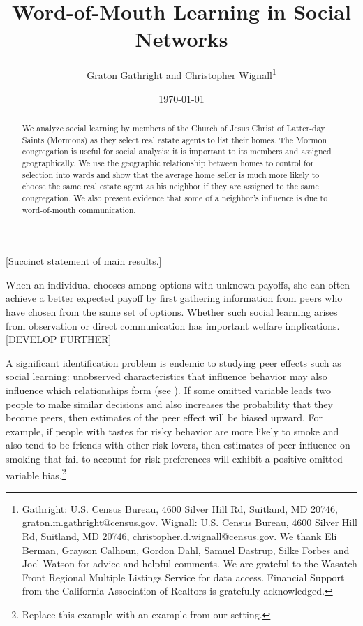 \documentclass[AEJ,draftmode]{AEA}
\begin{document}
\title{Word-of-Mouth Learning in Social Networks}
\author{Graton Gathright and Christopher Wignall\thanks{%
Gathright: U.S. Census Bureau, 4600 Silver Hill Rd, Suitland, MD 20746, graton.m.gathright@census.gov. Wignall: U.S. Census Bureau, 4600 Silver Hill Rd, Suitland, MD 20746, christopher.d.wignall@census.gov. We thank Eli Berman, Grayson Calhoun, Gordon Dahl, Samuel Dastrup, Silke Forbes and Joel Watson for advice and helpful comments.  We are grateful to the Wasatch Front Regional Multiple Listings Service for data access.  Financial Support from the California Association of Realtors is gratefully acknowledged.}}
\date{\today}
\JEL{}
\Keywords{}

\begin{abstract}
We analyze social learning by members of the Church of Jesus Christ of Latter-day Saints (Mormons) as they select real estate agents to list their homes. The Mormon congregation is useful for social analysis: it is important to its members and assigned geographically. We use the geographic relationship between homes to control for selection into wards and show that the average home seller is much more likely to choose the same real estate agent as his neighbor if they are assigned to the same congregation. We also present evidence that some of a neighbor's influence is due to word-of-mouth communication.
\end{abstract}

\maketitle

	[Succinct statement of main results.]

    When an individual chooses among options with unknown payoffs, she can often achieve a better expected payoff by first gathering information from peers who have chosen from the same set of options. Whether such social learning arises from observation or direct communication has important welfare implications. [DEVELOP FURTHER]
    
    A significant identification problem is endemic to studying peer effects such as social learning: unobserved characteristics that influence behavior may also influence which relationships form (see ). If some omitted variable leads two people to make similar decisions and also increases the probability that they become peers, then estimates of the peer effect will be biased upward. For example, if people with tastes for risky behavior are more likely to smoke and also tend to be friends with other risk lovers, then estimates of peer influence on smoking that fail to account for risk preferences will exhibit a positive omitted variable bias.\footnote{Replace this example with an example from our setting.}
\end{document}
